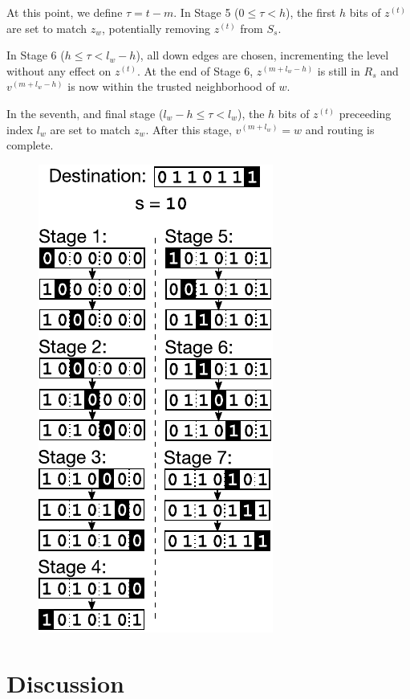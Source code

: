 \documentclass[prodmode,permissions]{acmsmall-ec16}
\begin{document}
At this point, we define $\tau = t - m$.
In Stage 5 ($0 \leq \tau < h$), the first $h$ bits of $z^{(t)}$ are set to
match $z_w$, potentially removing $z^{(t)}$ from $S_s$.

In Stage 6 ($h \leq \tau < l_w - h$), all down edges are chosen, incrementing
the level without any effect on $z^{(t)}$.
At the end of Stage 6, $z^{(m + l_w - h)}$ is still in $R_s$ and
$v^{(m + l_w - h)}$ is now within the trusted neighborhood of $w$.

In the seventh, and final stage ($l_w - h \leq \tau < l_w$), the $h$ bits of $z^{(t)}$
preceeding index $l_w$ are set to match $z_w$.
After this stage, $v^{(m + l_w)} = w$ and routing is complete.

\begin{figure}
\begin{center}
\includegraphics{fig-routing.pdf}
\end{center}
\caption{
\label{fig:routing}
}
\end{figure}

\section{Discussion}
\end{document}
